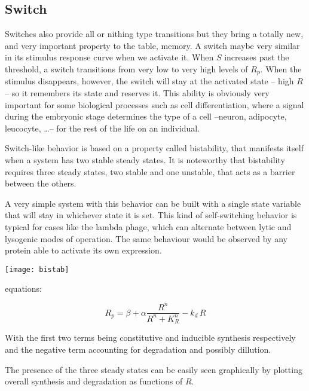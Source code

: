\subsection{Switch}
Switches also provide all or nithing type transitions but they bring a totally new, and very important property to the table, memory. A switch maybe very similar in its stimulus response curve when we activate it. When $S$ increases  past the threshold, a switch transitions from  very low  to very high levels of $R_p$. When the stimulus disappears, however, the switch will stay at the activated state -- high $R$ -- so it remembers its state and reserves it. This ability is obviously very important for some biological processes such as cell differentiation, where a signal during the embryonic stage determines the type of a cell --neuron, adipocyte, leucocyte, \dots -- for the rest of the life on an individual.

Switch-like behavior is based on a property called bistability, that manifests itself when a system has two stable steady states. It is noteworthy that bistability requires three steady states, two stable and one unstable, that acts as a barrier between the others.

A very simple system with this behavior can be built with a single state variable that will stay in whichever state it is set. This kind of self-switching behavior is typical for cases like the lambda phage, which can alternate between lytic and lysogenic modes of operation. The same behaviour would be observed by any protein able to activate its own expression.

\begin{marginfigure}
	\begin{center}
		\texttt{[image: bistab]}
	\end{center}
	\caption{ ... }
	\label{fig:bistab}
\end{marginfigure}

equations:

\begin{equation}
	R_p = \beta + \alpha \frac{R^n}{R^n  + K_R^n} - k_d \, R
\end{equation}

With the first two terms being constitutive and inducible synthesis respectively and the negative term accounting for degradation and possibly dillution.

The presence of the three steady states can be easily seen graphically by plotting overall synthesis and degradation as functions of $R$.

